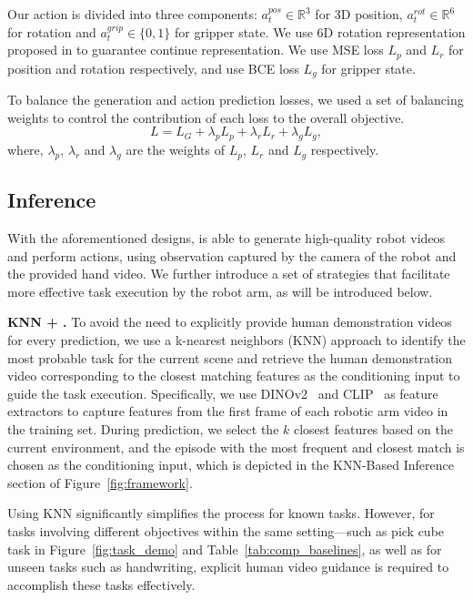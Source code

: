 Our action is divided into three components: $a_t^{pos} \in \mathbb{R}^3$ for 3D position, $a_t^{rot} \in \mathbb{R}^6$ for rotation and $a_t^{grip} \in \{0,1\}$ for gripper state. We use 6D rotation representation proposed in \cite{zhou2019continuity,ke20243d} to guarantee continue representation. We use MSE loss $L_p$ and $L_r$ for position and rotation respectively, and use BCE loss $L_g$ for gripper state.

To balance the generation and action prediction losses, we used a set of balancing weights to control the contribution of each loss to the overall objective.
\begin{equation}
    L = L_G + \lambda_p L_p + \lambda_r L_r + \lambda_g L_g,
\end{equation}
where, $\lambda_p$, $\lambda_r$ and $\lambda_g$ are the weights of $L_p$, $L_r$ and $L_g$ respectively.

\subsection{Inference}
\label{sec:inference}
With the aforementioned designs, \system is able to generate high-quality robot videos and perform actions, using observation captured by the camera of the robot and the provided hand video. We further introduce a set of strategies that  
facilitate more effective task execution by the robot arm, as will be introduced below.

\noindent\textbf{KNN + \system.}
To avoid the need to explicitly provide human demonstration videos for every prediction, we use a k-nearest neighbors (KNN) approach to identify the most probable task for the current scene and retrieve the human demonstration video corresponding to the closest matching features as the conditioning input to guide the task execution. Specifically, we use DINOv2~\cite{oquab2023dinov2} and CLIP~\cite{radford2021learning} as feature extractors to capture features from the first frame of each robotic arm video in the training set. During prediction, we select the $k$ closest features based on the current environment, and the episode with the most frequent and closest match is chosen as the conditioning input, which is depicted in the KNN-Based Inference section of Figure~\ref{fig:framework}.

Using KNN significantly simplifies the process for known tasks. However, for tasks involving different objectives within the same setting---such as pick cube task in Figure~\ref{fig:task_demo} and Table~\ref{tab:comp_baselines}, as well as for unseen tasks such as handwriting, explicit human video guidance is required to accomplish these tasks effectively.

